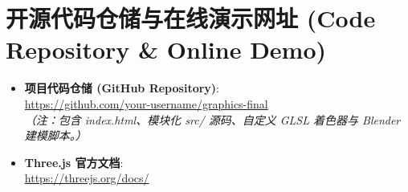 \documentclass[11pt, a4paper, oneside]{report}
\newcommand{\keyword}[1]{\textbf{#1}}
\begin{document}
\section{开源代码仓储与在线演示网址 (Code Repository \& Online Demo)}
\begin{itemize}
    \item \keyword{项目代码仓储 (GitHub Repository)}: \\
    \url{https://github.com/your-username/graphics-final} \\
    \textit{（注：包含 index.html、模块化 src/ 源码、自定义 GLSL 着色器与 Blender 建模脚本。）}
    \item \keyword{Three.js 官方文档}: \\
    \url{https://threejs.org/docs/}
\end{itemize}
\end{document}
